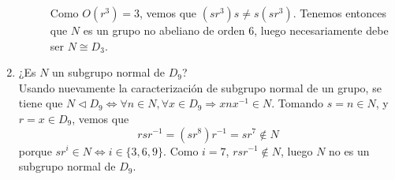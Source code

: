 \documentclass[12pt]{article}
\begin{document}
\begin{ejercicio}[3 puntos]
\begin{enumerate}[label=(\alph*)]
\begin{description}
                Como $O(r^3) = 3$, vemos que $(sr^3)s \neq s(sr^3)$. Tenemos entonces que $N$ es un grupo no abeliano de orden $6$, luego necesariamente debe ser $N \cong D_3$.
            \end{description}

            \item ¿Es $N$ un subgrupo normal de $D_9$? \\
            
            Usando nuevamente la caracterización de subgrupo normal de un grupo, se tiene que $N \vartriangleleft D_9 \iff \forall n \in N, \forall x \in D_9 \Longrightarrow xnx^{-1} \in N$. Tomando $s = n \in N$, y $r = x \in D_9$, vemos que
            $$rsr^{-1} = (sr^{8})r^{-1} = sr^{7} \notin N$$
            porque $sr^i \in N \iff i \in \{3,6,9\}$. Como $i=7$, $rsr^{-1} \notin N$, luego $N$ no es un subgrupo normal de $D_9$.
        \end{enumerate}
    \end{ejercicio}

    \newpage
\end{document}

